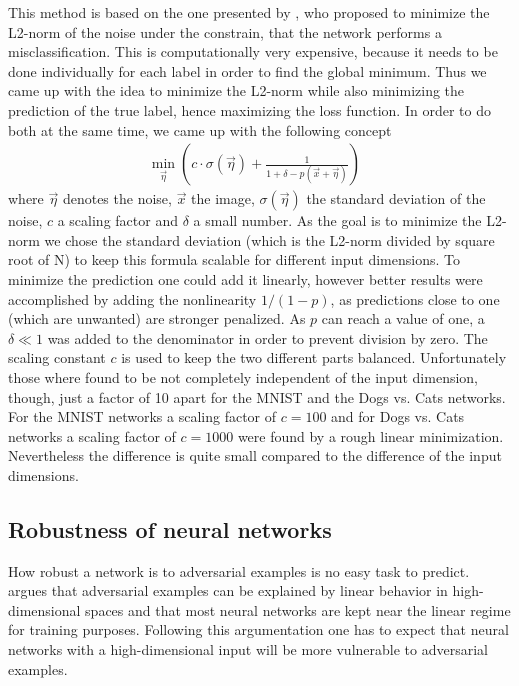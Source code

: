 \documentclass[%
 reprint,
 amsmath,amssymb,
 aps,
]{revtex4-1}
\begin{document}
This method is based on the one presented by \citeauthor{paperMinimize}, who proposed to minimize the L2-norm of the noise under the constrain, that the network performs a misclassification. This is computationally very expensive, because it needs to be done individually for each label in order to find the global minimum. Thus we came up with the idea to minimize the L2-norm while also minimizing the prediction of the true label, hence maximizing the loss function. In order to do both at the same time, we came up with the following concept
\begin{align}
\min_{\vec{\eta}} \left( c \cdot \sigma(\vec{\eta}) + \frac{1}{1 + \delta - p(\vec{x}+\vec{\eta})} \right) & \label{eq:minimize}
\end{align}
where $\vec{\eta}$ denotes the noise, $\vec{x}$ the image, $\sigma (\vec{\eta})$ the standard deviation of the noise, $c$ a scaling factor and $\delta$ a small number. As the goal is to minimize the L2-norm we chose the standard deviation (which is the L2-norm divided by square root of N) to keep this formula scalable for different input dimensions. To minimize the prediction one could add it linearly, however better results were accomplished by adding the nonlinearity $1/(1-p)$, as predictions close to one (which are unwanted) are stronger penalized. As $p$ can reach a value of one, a $\delta \ll 1$ was added to the denominator in order to prevent division by zero. The scaling constant $c$ is used to keep the two different parts balanced. Unfortunately those where found to be not completely independent of the input dimension, though, just a factor of 10 apart for the MNIST and the Dogs vs. Cats networks. For the MNIST networks a scaling factor of $c = 100$ and for Dogs vs. Cats networks a scaling factor of $c = 1000$ were found by a rough linear minimization. Nevertheless the difference is quite small compared to the difference of the input dimensions.

\subsection{Robustness of neural networks}
\label{sec:hypothesis}

How robust a network is to adversarial examples is no easy task to predict. \citeauthor{paperGrad} argues that adversarial examples can be explained by linear behavior in high-dimensional spaces and that most neural networks are kept near the linear regime for training purposes. Following this argumentation one has to expect that neural networks with a high-dimensional input will be more vulnerable to adversarial examples.
\end{document}
